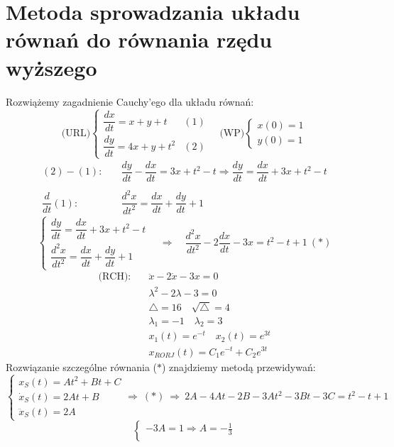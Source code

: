 \section{Metoda sprowadzania układu równań do równania rzędu wyższego}

\begin{przyk}
Rozwiążemy zagadnienie Cauchy'ego dla układu równań:
$$\textrm{(URL)}\left\{\begin{array}{ll}
\dfrac{dx}{dt}=x+y+t & (1)\\
\dfrac{dy}{dt}=4x+y+t^2 & (2)
\end{array}\right.\quad
\textrm{(WP)}\left\{\begin{array}{l}
x(0)=1\\
y(0)=1
\end{array}\right.$$
$$\begin{array}{rl}
(2)-(1):\quad & \dfrac{dy}{dt}-\dfrac{dx}{dt}=3x+t^2-t\Rightarrow\dfrac{dy}{dt}=\dfrac{dx}{dt}+3x+t^2-t\\
\\
\dfrac{d}{dt}(1):\quad & \dfrac{d^2x}{dt^2}=\dfrac{dx}{dt}+\dfrac{dy}{dt}+1
\end{array}$$
$$\left\{\begin{array}{l}
\dfrac{dy}{dt}=\dfrac{dx}{dt}+3x+t^2-t\\
\dfrac{d^2x}{dt^2}=\dfrac{dx}{dt}+\dfrac{dy}{dt}+1
\end{array}\right.\quad\Rightarrow\quad\dfrac{d^2x}{dt^2}-2\dfrac{dx}{dt}-3x=t^2-t+1\ (\ast)$$
$$\begin{array}{ll}
\textrm{(RCH)}:\quad & \ddot{x}-2\dot{x}-3x=0\\
& \lambda^2-2\lambda-3=0\\
& \triangle=16\quad\sqrt{\triangle}=4\\
& \lambda_1=-1\quad\lambda_2=3\\
& x_1(t)=e^{-t}\quad x_2(t)=e^{3t}\\
& x_{RORJ}(t)=C_1e^{-t}+C_2e^{3t}
\end{array}$$
Rozwiązanie szczególne równania ($\ast$) znajdziemy metodą przewidywań:
$$\left\{\begin{array}{l}
x_S(t)=At^2+Bt+C\\
\dot{x}_S(t)=2At+B\\
\ddot{x}_S(t)=2A
\end{array}\right.\Rightarrow\ (\ast)\ \Rightarrow\ 2A-4At-2B-3At^2-3Bt-3C=t^2-t+1$$
$$\left\{\begin{array}{l}
-3A=1\Rightarrow A=-\frac{1}{3}\\

\end{array}$$
\end{przyk}
